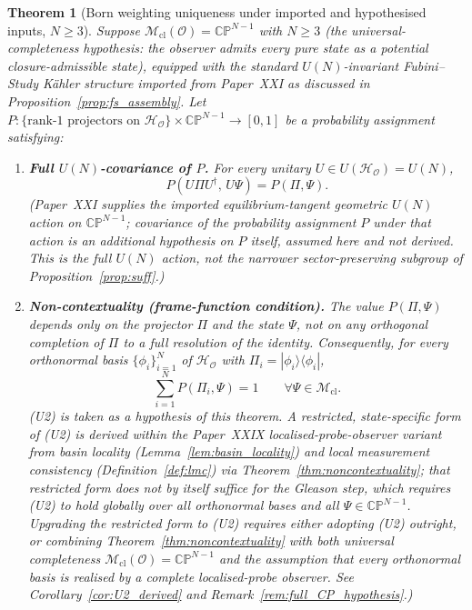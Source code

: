 \documentclass[12pt]{article}
\newtheorem{theorem}{Theorem}
\newcommand{\Ocal}{\mathcal{O}}
\newcommand{\Hcal}{\mathcal{H}}
\newcommand{\Mcl}{\mathcal{M}_{\mathrm{cl}}}
\begin{document}
\begin{theorem}[Born weighting uniqueness under imported and hypothesised inputs, $N \geq 3$]\label{thm:born_unique}
Suppose $\Mcl(\Ocal) = \mathbb{CP}^{N-1}$ with $N \geq 3$ (the universal-completeness hypothesis: the observer admits every pure state as a potential closure-admissible state), equipped with the standard $U(N)$-invariant Fubini--Study K\"ahler structure imported from Paper~XXI as discussed in Proposition~\ref{prop:fs_assembly}. Let $P: \{\text{rank-1 projectors on } \Hcal_\Ocal\} \times \mathbb{CP}^{N-1} \to [0,1]$ be a probability assignment satisfying:
\begin{enumerate}
    \item[\textbf{(U1)}] \textbf{Full $U(N)$-covariance of $P$.} For every unitary $U \in U(\Hcal_\Ocal) = U(N)$,
    \begin{equation}\label{eq:U1}
        P(U\Pi U^\dagger,\, U\Psi) = P(\Pi, \Psi).
    \end{equation}
    \emph{(Paper~XXI supplies the imported equilibrium-tangent geometric $U(N)$ action on $\mathbb{CP}^{N-1}$; covariance of the probability assignment $P$ under that action is an additional hypothesis on $P$ itself, assumed here and not derived. This is the full $U(N)$ action, not the narrower sector-preserving subgroup of Proposition~\ref{prop:suff}.)}
    \item[\textbf{(U2)}] \textbf{Non-contextuality (frame-function condition).} The value $P(\Pi, \Psi)$ depends only on the projector $\Pi$ and the state $\Psi$, not on any orthogonal completion of $\Pi$ to a full resolution of the identity. Consequently, for every orthonormal basis $\{\phi_i\}_{i=1}^{N}$ of $\Hcal_\Ocal$ with $\Pi_i = |\phi_i\rangle\langle\phi_i|$,
    \begin{equation}\label{eq:U2}
        \sum_{i=1}^{N} P(\Pi_i, \Psi) = 1 \qquad \forall \Psi \in \Mcl.
    \end{equation}
    \emph{(U2) is taken as a hypothesis of this theorem. A restricted, state-specific form of (U2) is derived within the Paper~XXIX localised-probe-observer variant from basin locality (Lemma~\ref{lem:basin_locality}) and local measurement consistency (Definition~\ref{def:lmc}) via Theorem~\ref{thm:noncontextuality}; that restricted form does not by itself suffice for the Gleason step, which requires (U2) to hold globally over all orthonormal bases and all $\Psi \in \mathbb{CP}^{N-1}$. Upgrading the restricted form to (U2) requires either adopting (U2) outright, or combining Theorem~\ref{thm:noncontextuality} with \emph{both} universal completeness $\Mcl(\Ocal) = \mathbb{CP}^{N-1}$ \emph{and} the assumption that every orthonormal basis is realised by a complete localised-probe observer. See Corollary~\ref{cor:U2_derived} and Remark~\ref{rem:full_CP_hypothesis}.)}

\end{enumerate}
\end{theorem}
\end{document}
